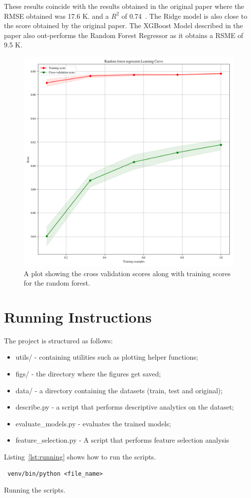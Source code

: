 \documentclass{article}
\begin{document}
These results coincide with the results obtained in the original paper where the RMSE obtained was 17.6 K. and a \(R^2\) of 0.74~\autocite{hamidieh2018data}. The Ridge model is also close to the score obtained by the original paper. The XGBoost Model described in the paper also out-performs the Random Forest Regressor as it obtains a RSME of 9.5 K.

\begin{figure}[H]
\label{fig:learningcurve}
  \centering
    \includegraphics[scale=0.5]{images/randomforestlearningcurve.png}
    \caption{A plot showing the cross validation scores along with training scores for the random forest.}
\end{figure}
\section{Running Instructions}
The project is structured as follows:
    \begin{itemize}
        \item utils/ - containing utilities such as plotting helper functions;
        \item figs/ - the directory where the figures get saved;
        \item data/ - a directory containing the datasets (train, test and original);
        \item describe.py - a script that performs descriptive analytics on the dataset;
        \item evaluate\_models.py - evaluates the trained models;
        \item feature\_selection.py - A script that performs feature selection analysis
    \end{itemize}{}
Listing~\ref{lst:running} shows how to run the scripts.
\begin{listing}[ht]
\label{lst:running}
\begin{verbatim}
 venv/bin/python <file_name>
\end{verbatim}
\caption{Running the scripts.}
\end{listing}{}
\end{document}

